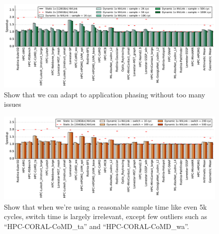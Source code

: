 \begin{figure}[tp]
    \centering
    \includegraphics[width=1.0\textwidth]{figures/plot_nvlink_sample_time.pdf}
    \caption{Show that we can adapt to application phasing without too many 
issues}
    \label{fig:sampletime}
\end{figure}

\begin{figure}[tp]
    \centering
    \includegraphics[width=1.0\textwidth]{figures/plot_nvlink_switch_time_sample_time5000.pdf}
    \caption{Show that when we're using a reasonable sample time like even 5k 
cycles, switch time is largely irrelevant, except few 
outliers such as ``HPC-CORAL-CoMD\_ta'' and ``HPC-CORAL-CoMD\_wa''.}
    \label{fig:switchtime}
\end{figure}